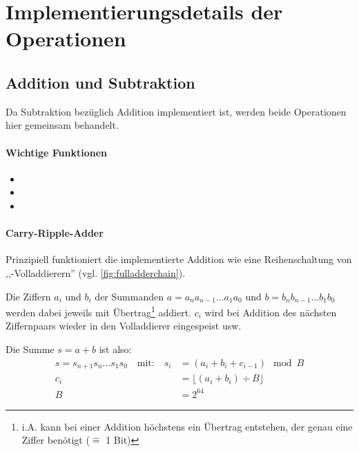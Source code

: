 
\section{Implementierungsdetails der Operationen} \label{sec:impldetails}
\subsection{Addition und Subtraktion}
    Da Subtraktion bezüglich Addition implementiert ist, werden beide Operationen hier gemeinsam behandelt.

    \paragraph*{Wichtige Funktionen}
        \begin{itemize} \tightlist
            \item {}
            \item {}
            \item {}
        \end{itemize}

    \paragraph*{Carry-Ripple-Adder}
        Prinzipiell funktioniert die implementierte Addition wie eine Reihenschaltung von ,,-Volladdierern'' (vgl. \autoref{fig:fulladderchain}).

        Die Ziffern $a_i$ und $b_i$ der Summanden $a=a_{n}a_{n-1}\dots{}a_{1}a_{0}$ und $b=b_{n}b_{n-1}\dots{}b_{1}b_{0}$ werden dabei jeweils mit Übertrag\footnote{i.A. kann bei einer Addition höchstens ein Übertrag entstehen, der genau eine Ziffer benötigt ($\hat{=}$ 1 Bit)} addiert.
        $c_i$ wird bei Addition des nächsten Ziffernpaars wieder in den Volladdierer eingespeist usw.

        Die Summe $s=a+b$ ist also:
        \begin{align*}
        s = s_{n+1}s_{n}\dots{}s_{1}s_{0} \quad
            \text{mit:} \quad
                s_i &= (a_i + b_i + c_{i-1}) \mod B \\
                c_i &= \lfloor (a_i + b_i) \div B \rfloor \\
                  B &= 2^{64}
        \end{align*}

